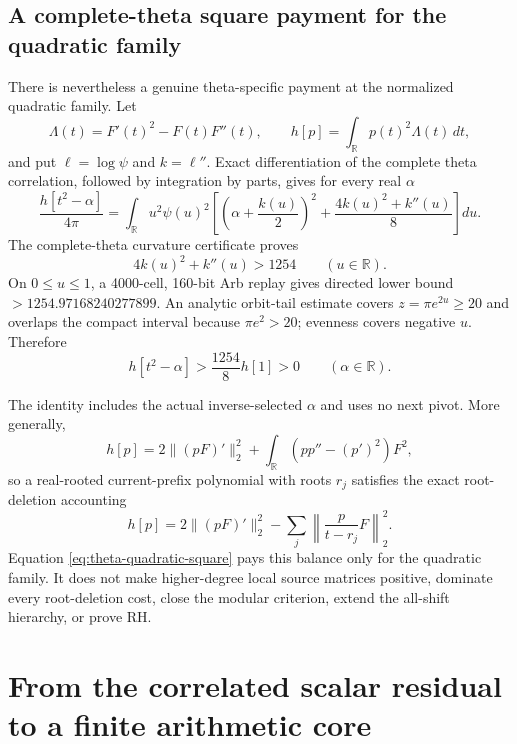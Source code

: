 \documentclass[11pt]{article}
\theoremstyle{definition}
\theoremstyle{remark}
\newcommand{\R}{\mathbb{R}}
\begin{document}
\subsection{A complete-theta square payment for the quadratic family}

There is nevertheless a genuine theta-specific payment at the normalized
quadratic family. Let
\begin{equation}
 \Lambda(t)=F'(t)^2-F(t)F''(t),
 \qquad h[p]=\int_{\R}p(t)^2\Lambda(t)\,dt,
\end{equation}
and put $\ell=\log\psi$ and $k=\ell''$. Exact differentiation of the complete
theta correlation, followed by integration by parts, gives for every real
$\alpha$
\begin{equation}
 \frac{h[t^2-\alpha]}{4\pi}
 =\int_{\R}u^2\psi(u)^2\left[
   \left(\alpha+\frac{k(u)}2\right)^2
   +\frac{4k(u)^2+k''(u)}8
 \right]du.
 \label{eq:theta-quadratic-square}
\end{equation}
The complete-theta curvature certificate proves
\begin{equation}
 4k(u)^2+k''(u)>1254\qquad(u\in\R).
 \label{eq:theta-curvature-square}
\end{equation}
On $0\le u\le1$, a 4000-cell, 160-bit Arb replay gives directed lower bound
$>1254.97168240277899$. An analytic orbit-tail estimate covers
$z=\pi e^{2u}\ge20$ and overlaps the compact interval because
$\pi e^2>20$; evenness covers negative $u$. Therefore
\begin{equation}
 h[t^2-\alpha]>\frac{1254}{8}h[1]>0
 \qquad(\alpha\in\R).
 \label{eq:quadratic-family-payment}
\end{equation}

The identity includes the actual inverse-selected $\alpha$ and uses no next
pivot. More generally,
\begin{equation}
 h[p]=2\|(pF)'\|_2^2+\int_{\R}(pp''-(p')^2)F^2,
\end{equation}
so a real-rooted current-prefix polynomial with roots $r_j$ satisfies the exact
root-deletion accounting
\begin{equation}
 h[p]=2\|(pF)'\|_2^2-
      \sum_j\left\|\frac{p}{t-r_j}F\right\|_2^2.
\end{equation}
Equation \eqref{eq:theta-quadratic-square} pays this balance only for the
quadratic family. It does not make higher-degree local source matrices
positive, dominate every root-deletion cost, close the modular criterion,
extend the all-shift hierarchy, or prove RH.

\section{From the correlated scalar residual to a finite arithmetic core}
\end{document}
